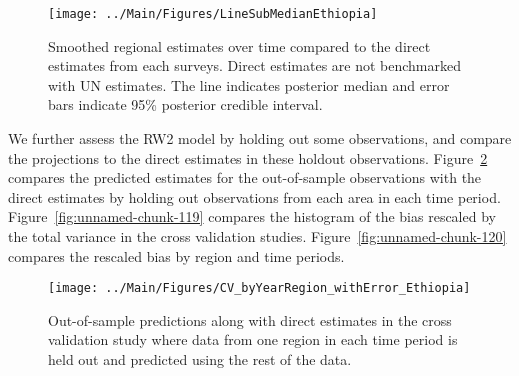 \documentclass[12pt]{article}\usepackage[]{graphicx}\usepackage[]{color}
\newenvironment{knitrout}{}{} %
\begin{document}
\begin{knitrout}
\color{fgcolor}\begin{figure}[bht]

{\centering \texttt{[image: ../Main/Figures/LineSubMedianEthiopia]} 

}

\caption[Smoothed regional estimates over time compared to the direct estimates from each surveys]{Smoothed regional estimates over time compared to the direct estimates from each surveys. Direct estimates are not benchmarked with UN estimates. The line indicates posterior median and error bars indicate 95\% posterior credible interval.}\label{fig:unnamed-chunk-117}
\end{figure}


\end{knitrout}
We further assess the RW2 model by holding out some observations, and compare the projections to the direct estimates in these holdout observations. Figure~\ref{fig:unnamed-chunk-118} compares the predicted estimates for the out-of-sample observations  with the direct estimates by holding out observations from each area in each time period.  Figure~\ref{fig:unnamed-chunk-119} compares the histogram of the bias rescaled by the total variance in the cross validation studies. Figure~\ref{fig:unnamed-chunk-120} compares the rescaled bias by region and time periods.



 
\begin{knitrout}
\color{fgcolor}\begin{figure}[bht]

{\centering \texttt{[image: ../Main/Figures/CV\_byYearRegion\_withError\_Ethiopia]} 

}

\caption[Out-of-sample predictions along with direct estimates in the cross validation study where data from one region in each time period is held out and predicted using the rest of the data]{Out-of-sample predictions along with direct estimates in the cross validation study where data from one region in each time period is held out and predicted using the rest of the data.}\label{fig:unnamed-chunk-118}
\end{figure}


\end{knitrout}
\end{document}
